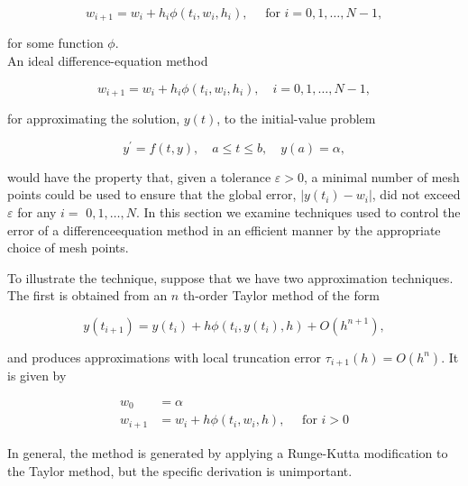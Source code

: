 $$
w_{i+1}=w_{i}+h_{i} \phi\left(t_{i}, w_{i}, h_{i}\right), \quad \text { for } i=0,1, \ldots, N-1,
$$

for some function $\phi$.\\
An ideal difference-equation method

$$
w_{i+1}=w_{i}+h_{i} \phi\left(t_{i}, w_{i}, h_{i}\right), \quad i=0,1, \ldots, N-1,
$$

for approximating the solution, $y(t)$, to the initial-value problem

$$
y^{\prime}=f(t, y), \quad a \leq t \leq b, \quad y(a)=\alpha,
$$

would have the property that, given a tolerance $\varepsilon>0$, a minimal number of mesh points could be used to ensure that the global error, $\left|y\left(t_{i}\right)-w_{i}\right|$, did not exceed $\varepsilon$ for any $i=$ $0,1, \ldots, N$. 
In this section we examine techniques used to control the error of a differenceequation method in an efficient manner by the appropriate choice of mesh points.


To illustrate the technique, suppose that we have two approximation techniques. The first is obtained from an $n$ th-order Taylor method of the form

$$
y\left(t_{i+1}\right)=y\left(t_{i}\right)+h \phi\left(t_{i}, y\left(t_{i}\right), h\right)+O\left(h^{n+1}\right),
$$

and produces approximations with local truncation error $\tau_{i+1}(h)=O\left(h^{n}\right)$. It is given by

$$
\begin{aligned}
w_{0} & =\alpha \\
w_{i+1} & =w_{i}+h \phi\left(t_{i}, w_{i}, h\right), \quad \text { for } i>0
\end{aligned}
$$

In general, the method is generated by applying a Runge-Kutta modification to the Taylor method, but the specific derivation is unimportant.

